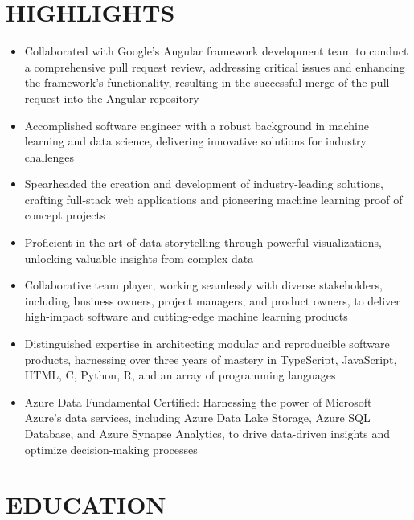 \documentclass[10pt,letterpaper,sans]{moderncv} %
\begin{document}
	
	\makecvtitle
	
\vspace{-1cm}
    \section{HIGHLIGHTS}
	\begin{itemize}
		\item Collaborated with Google's Angular framework development team to conduct a comprehensive pull request review, addressing critical issues and enhancing the framework's functionality, resulting in the successful merge of the pull request into the Angular repository
		
		\item Accomplished software engineer with a robust background in machine learning and data science, delivering innovative solutions for industry challenges
		
		\item Spearheaded the creation and development of industry-leading solutions, crafting full-stack web applications and pioneering machine learning proof of concept projects
		
		\item Proficient in the art of data storytelling through powerful visualizations, unlocking valuable insights from complex data
		
		\item Collaborative team player, working seamlessly with diverse stakeholders, including business owners, project managers, and product owners, to deliver high-impact software and cutting-edge machine learning products
		
		\item Distinguished expertise in architecting modular and reproducible software products, harnessing over three years of mastery in TypeScript, JavaScript, HTML, C, Python, R, and an array of programming languages
		
		\item Azure Data Fundamental Certified: Harnessing the power of Microsoft Azure's data services, including Azure Data Lake Storage, Azure SQL Database, and Azure Synapse Analytics, to drive data-driven insights and optimize decision-making processes
		
	\end{itemize}
	\section{EDUCATION}
\end{document}
